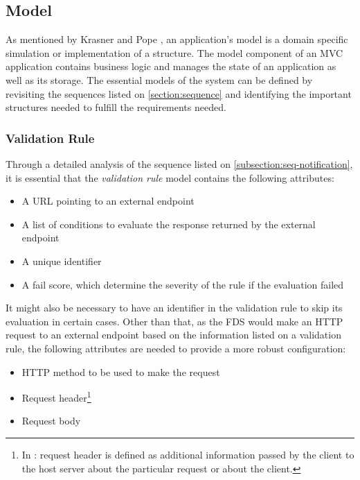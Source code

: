 \subsection{Model}
  \label{subsection:model}

As mentioned by Krasner and Pope \autocite{krasner-pope-88}, an application's model is a domain specific simulation or implementation of a structure. The model component of an MVC application contains business logic and manages the state of an application as well as its storage. 
The essential models of the system can be defined by revisiting the sequences listed on \autoref{section:sequence} and identifying the important structures needed to fulfill the requirements needed.
  
\subsubsection{Validation Rule}
Through a detailed analysis of the sequence listed on \autoref{subsection:seq-notification}, it is essential that the \emph{validation rule} model contains the following attributes:

\begin{itemize}
  \item A URL pointing to an external endpoint
  \item A list of conditions to evaluate the response returned by the external endpoint
  \item A unique identifier
  \item A fail score, which determine the severity of the rule if the evaluation failed
\end{itemize}

It might also be necessary to have an identifier in the validation rule to skip its evaluation in certain cases. Other than that, as the FDS would make an HTTP request to an external endpoint based on the information listed on a validation rule, the following attributes are needed to provide a more robust configuration:

\begin{itemize}
  \item HTTP method to be used to make the request
  \item Request header\footnote{In \autocite[\enquote{5.3 Request Header Fields}]{http-rfc}: request header is defined as additional information passed by the client to the host server about the particular request or about the client.}
  \item Request body
\end{itemize}

